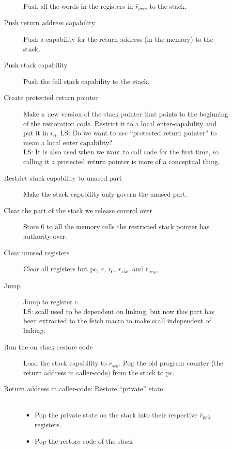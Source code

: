 \documentclass[a4paper]{article}
\newcommand{\forcenewline}{$\phantom{v}$\\}
\newcommand\lau[1]{{\color{purple} \sf \footnotesize {LS: #1}}\\}
\newcommand{\var}[1]{\mathit{#1}}
\newcommand{\pcreg}{\mathrm{pc}}
\begin{document}
\begin{description}
\begin{description}
                  Push all the words in the registers in  $\bar{r}_{\var{priv}}$ to the stack.
                \item [Push return address capability]
                  Push a capability for the return address (in the memory) to the stack.
                \item [Push stack capability]
                  Push the full stack capability to the stack.
                \item [Create protected return pointer]
                  Make a new version of the stack pointer that points to the beginning of the restoration code. Restrict it to a local enter-capability and put it in $r_0$. \lau{Do we want to use ``protected return pointer'' to mean a local enter capability?} \lau{It is also used when we want to call code for the first time, so calling it a protected return pointer is more of a conceptual thing.}
                \item [Restrict stack capability to unused part]
                  Make the stack capability only govern the unused part.
                \item [Clear the part of the stack we release control over]
                  Store 0 to all the memory cells the restricted stack pointer has authority over.
                \item [Clear unused registers]
                  Clear all registers but $\pcreg$, $r$, $r_0$, $r_{\var{stk}}$, and $\bar{r}_{\var{args}}$.
                \item [Jump] Jump to register $r$.
\\ \lau{scall used to be dependent on linking, but now this part has been extracted to the fetch macro to make scall independent of linking.}
                \item [Run the on stack restore code]
                  Load the stack capability to $r_{\var{stk}}$. Pop the old program counter (the return address in caller-code) from the stack to $\pcreg$.
                \item [Return address in caller-code: Restore ``private'' state] \forcenewline
                  \begin{itemize}
                  \item Pop the private state on the stack into their respective $\bar{r}_{\var{priv}}$ registers.
                  \item Pop the restore code of the stack
                  \end{itemize}\
                \end{description}
              \end{description}
\end{document}
